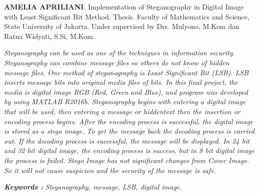 \documentclass{jtetiskripsi}
\begin{document}
\begin{abstracteng}
\textbf{AMELIA APRILIANI}. Implementation of Steganography in Digital Image with Least Significant Bit Method. Thesis. Faculty of Mathematics and Science, State University of Jakarta. Under supervised by Drs. Mulyono, M.Kom dan Ratna Widyati, S.Si, M.Kom.
\vskip1cm

	\textit{Steganography can be used as one of the techniques in information security. Steganography can combine message files so others do not know of hidden message files. One method of steganography is Least Significant Bit (LSB). LSB inserts message bits into original media files of bits. In this final project, the media is digital image RGB (Red, Green and Blue), and program was developed by using MATLAB R2016b. Steganography begins with entering a digital image that will be used, then entering a message or hiddentext then the insertion or encoding process begins. After the encoding process is successful, the digital image is stored as a stego image. To get the message back the decoding process is carried out. If the decoding process is successful, the message will be displayed. In 24 bit and 32 bit digital image, the encoding process is success, but in 8 bit digital image the process is failed. Stego Image has not significant changes from Cover Image. So it will not cause suspicion and the security of the message is safe.}    
	
	\bigskip
	\noindent
	\textbf{\emph{Keywords :}} \emph{Steganography, message, LSB, digital image}.
\end{abstracteng}


\tableofcontents 
{}
\listoffigures
{}
\listoftables
{}

\begin{counterpage}
\end{counterpage}



\end{document}
